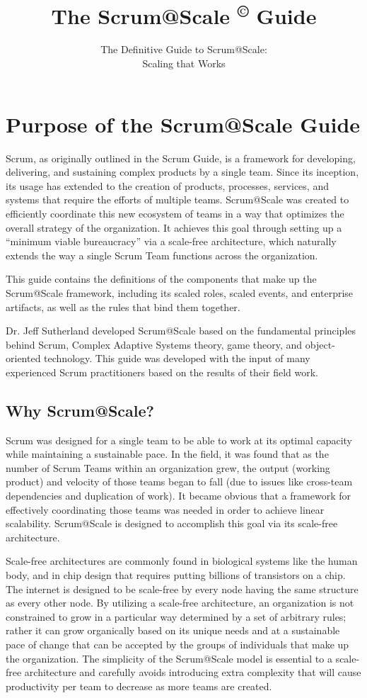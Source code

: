 \documentclass[12pt,a4paper,parskip=full]{scrartcl}
\title{\Huge{\color{red}\textbf{The Scrum@Scale 
\textsuperscript{\copyright} 
Guide}}}
\subtitle{\color{gray}The Definitive Guide to Scrum@Scale:\\ Scaling that Works}
\date{}
\begin{document}

\section{Purpose of the Scrum@Scale Guide}

Scrum, as originally outlined in the Scrum Guide, is a framework for developing, delivering, and sustaining complex products by a single team. Since its inception, its usage has extended to the creation of products, processes, services, and systems that require the efforts of multiple teams. Scrum@Scale was created to efficiently coordinate this new ecosystem of teams in a way that optimizes the overall strategy of the organization. It achieves this goal through setting up a ``minimum viable bureaucracy'' via a scale-free architecture, which naturally extends the way a single Scrum Team functions across the organization.

This guide contains the definitions of the components that make up the Scrum@Scale framework, including its scaled roles, scaled events, and enterprise artifacts, as well as the rules that bind them together.

Dr. Jeff Sutherland developed Scrum@Scale based on the fundamental principles behind Scrum, Complex Adaptive Systems theory, game theory, and object-oriented technology. This guide was developed with the input of many experienced Scrum practitioners based on the results of their field work. 

\subsection{Why Scrum@Scale?}

Scrum was designed for a single team to be able to work at its optimal capacity while maintaining a sustainable pace. In the field, it was found that as the number of Scrum Teams within an organization grew, the output (working product) and velocity of those teams began to fall (due to issues like cross-team dependencies and duplication of work). It became obvious that a framework for effectively coordinating those teams was needed in order to achieve linear scalability. Scrum@Scale is designed to accomplish this goal via its scale-free architecture.

Scale-free architectures are commonly found in biological systems like the human body, and in chip design that requires putting billions of transistors on a chip. The internet is designed to be scale-free by every node having the same structure as every other node. By utilizing a scale-free architecture, an organization is not constrained to grow in a particular way determined by a set of arbitrary rules; rather it can grow organically based on its unique needs and at a sustainable pace of change that can be accepted by the groups of individuals that make up the organization. The simplicity of the Scrum@Scale model is essential to a scale-free architecture and carefully avoids introducing extra complexity that will cause productivity per team to decrease as more teams are created.
\end{document}
